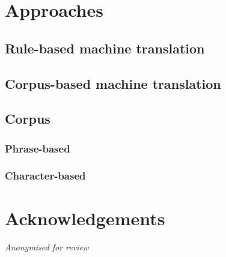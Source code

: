 \documentclass[11pt]{article}
\begin{document}
\section{Approaches}

\subsection{Rule-based machine translation}

\subsection{Corpus-based machine translation}

\subsection{Corpus}

\subsubsection{Phrase-based}

\subsubsection{Character-based }

\section*{Acknowledgements}

\emph{Anonymised for review}



\end{document}
